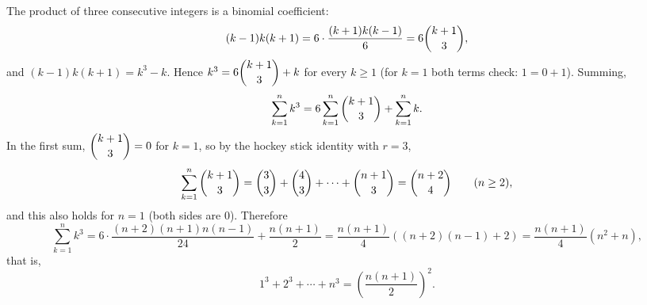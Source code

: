 The product of three consecutive integers is a binomial coefficient:
\[(k-1)k(k+1)=6\cdot\dfrac{(k+1)k(k-1)}{6}=6\dbinom{k+1}{3},\]
and $(k-1)k(k+1)=k^3-k$. Hence $k^3=6\dbinom{k+1}3+k$ for every $k\ge1$ (for $k=1$ both terms check: $1=0+1$). Summing,
\[\sum_{k=1}^{n}k^3=6\sum_{k=1}^{n}\dbinom{k+1}{3}+\sum_{k=1}^nk .\]
In the first sum, $\dbinom{k+1}3=0$ for $k=1$, so by the hockey stick identity with $r=3$,
\[\sum_{k=1}^{n}\dbinom{k+1}{3}=\dbinom33+\dbinom43+\cdots+\dbinom{n+1}3=\dbinom{n+2}{4}\qquad(n\ge2),\]
and this also holds for $n=1$ (both sides are $0$). Therefore
\[\sum_{k=1}^{n}k^3=6\cdot\dfrac{(n+2)(n+1)n(n-1)}{24}+\dfrac{n(n+1)}{2}=\dfrac{n(n+1)}{4}\left((n+2)(n-1)+2\right)=\dfrac{n(n+1)}{4}\left(n^2+n\right),\]
that is,
\[1^3+2^3+\cdots+n^3=\boxed{\left(\dfrac{n(n+1)}{2}\right)^2}.\]
